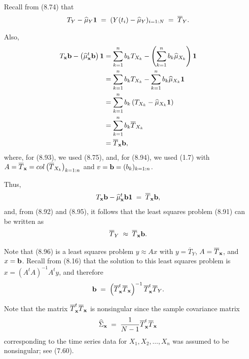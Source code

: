 
Recall from (8.74) that
\begin{equation}
T_Y - \widehat\mu_Y\mathbf{1} \;=\; (Y(t_i)-\widehat\mu_Y)_{i=1:N} \;=\; \overline{T}_Y.
\end{equation}

Also,
\begin{align}
T_{\mathbf{x}}\mathbf{b} - \left(\widehat\mu_{\mathbf{x}}^t\mathbf{b}\right)\mathbf{1} &= \sum_{k=1}^n b_kT_{X_k} -
\left(\sum_{k=1}^n b_k\widehat\mu_{X_k}\right)\mathbf{1} \notag\\
&= \sum_{k=1}^n b_kT_{X_k} - \sum_{k=1}^n b_k\widehat\mu_{X_k}\mathbf{1} \notag\\
&= \sum_{k=1}^n b_k\left(T_{X_k}-\widehat\mu_{X_k}\mathbf{1}\right) \notag\\
&= \sum_{k=1}^n b_k\overline{T}_{X_k}\\
&= \overline{T}_{\mathbf{x}}\mathbf{b},
\end{align}
where, for (8.93), we used (8.75), and, for (8.94), we used (1.7) with $A =
\overline{T}_{\mathbf{x}} = col\left(\overline{T}_{X_k}\right)_{k=1:n}$ and $v = \mathbf{b} =
(b_k)_{k=1:n}$.

Thus,
\begin{equation}
T_{\mathbf{x}}\mathbf{b} - \widehat\mu_{\mathbf{x}}^t\mathbf{b}\mathbf{1} \;=\; \overline{T}_{\mathbf{x}}\mathbf{b},
\end{equation}
and, from (8.92) and (8.95), it follows that the least squares problem (8.91) can be
written as
\begin{equation}
\overline{T}_Y \;\approx\; \overline{T}_{\mathbf{x}}\mathbf{b}.
\end{equation}

Note that (8.96) is a least squares problem $y\approx Ax$ with $y=\overline{T}_Y$,
$A=\overline{T}_{\mathbf{x}}$, and $x=\mathbf{b}$. Recall from (8.16) that the solution to this
least squares problem is $x=(A^tA)^{-1}A^ty$, and therefore
\begin{equation}
\mathbf{b} \;=\; \left(\overline{T}_{\mathbf{x}}^t\overline{T}_{\mathbf{x}}\right)^{-1}
\overline{T}_{\mathbf{x}}^t\overline{T}_Y.
\end{equation}

Note that the matrix $\overline{T}_{\mathbf{x}}^t\overline{T}_{\mathbf{x}}$ is nonsingular since the
sample covariance matrix
\begin{equation}
\widehat\Sigma_{\mathbf{x}} \;=\; \frac{1}{N-1}\overline{T}_{\mathbf{x}}^t\overline{T}_{\mathbf{x}}
\end{equation}
corresponding to the time series data for $X_1, X_2, \ldots, X_n$ was assumed to be
nonsingular; see (7.60).

